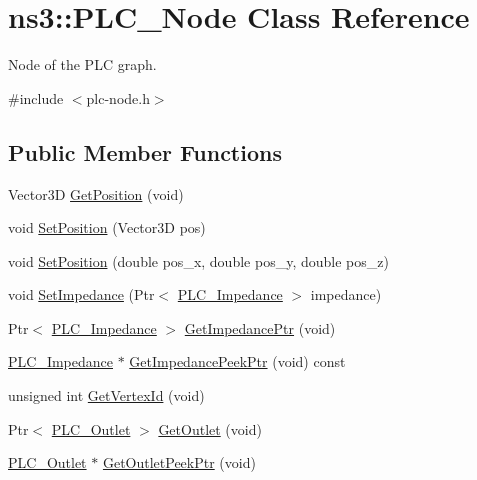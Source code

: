 \hypertarget{classns3_1_1PLC__Node}{\section{ns3\-:\-:\-P\-L\-C\-\_\-\-Node \-Class \-Reference}
\label{classns3_1_1PLC__Node}
}


\-Node of the \-P\-L\-C graph.  




{\ttfamily \#include $<$plc-\/node.\-h$>$}

\subsection*{\-Public \-Member \-Functions}
\begin{DoxyCompactItemize}
\item 
\-Vector3\-D \hyperlink{classns3_1_1PLC__Node_a7d674232f339efb17da8dcfadcb22163}{\-Get\-Position} (void)
\item 
void \hyperlink{classns3_1_1PLC__Node_ada328a74b065ac102694749a8919fe1f}{\-Set\-Position} (\-Vector3\-D pos)
\item 
void \hyperlink{classns3_1_1PLC__Node_aa5ed946abf9e3c9fc6be7ae4e2050da0}{\-Set\-Position} (double pos\-\_\-x, double pos\-\_\-y, double pos\-\_\-z)
\item 
void \hyperlink{classns3_1_1PLC__Node_a31c5810c134f37b72ba3db59dad75621}{\-Set\-Impedance} (\-Ptr$<$ \hyperlink{classns3_1_1PLC__ValueBase}{\-P\-L\-C\-\_\-\-Impedance} $>$ impedance)
\item 
\-Ptr$<$ \hyperlink{classns3_1_1PLC__ValueBase}{\-P\-L\-C\-\_\-\-Impedance} $>$ \hyperlink{classns3_1_1PLC__Node_a988d9ed14676cc4d8b9725d3259008c0}{\-Get\-Impedance\-Ptr} (void)
\item 
\hyperlink{classns3_1_1PLC__ValueBase}{\-P\-L\-C\-\_\-\-Impedance} $\ast$ \hyperlink{classns3_1_1PLC__Node_a4283ee95d6bedc63c499f5ca08121ebf}{\-Get\-Impedance\-Peek\-Ptr} (void) const 
\item 
unsigned int \hyperlink{classns3_1_1PLC__Node_a0d5cca2e02d101bfba1c970b2909ce2e}{\-Get\-Vertex\-Id} (void)
\item 
\-Ptr$<$ \hyperlink{classns3_1_1PLC__Outlet}{\-P\-L\-C\-\_\-\-Outlet} $>$ \hyperlink{classns3_1_1PLC__Node_a9db89c2d14fb4bbdf2c2f89baf75aaa8}{\-Get\-Outlet} (void)
\item 
\hyperlink{classns3_1_1PLC__Outlet}{\-P\-L\-C\-\_\-\-Outlet} $\ast$ \hyperlink{classns3_1_1PLC__Node_acdbac44dcd3dae5a5b13b562857778d5}{\-Get\-Outlet\-Peek\-Ptr} (void)

\end{DoxyCompactItemize}
